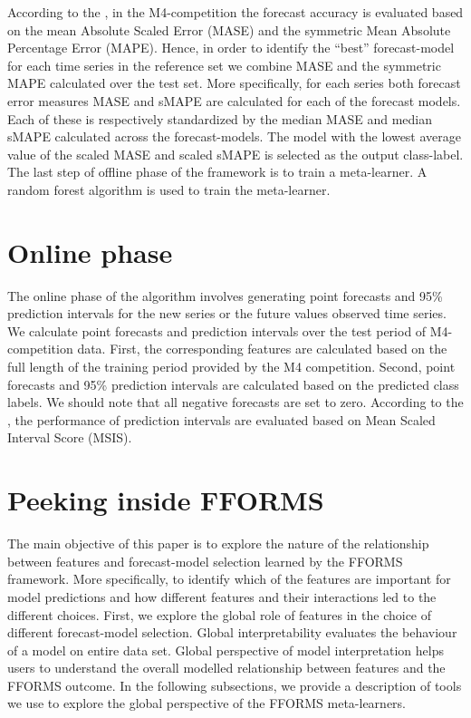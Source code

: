 \documentclass[11pt,a4paper,]{article}
\begin{document}
According to the \textcite{M4compguide}, in the M4-competition the forecast accuracy is evaluated based on the mean Absolute Scaled Error (MASE) and the symmetric Mean Absolute Percentage Error (MAPE). Hence, in order to identify the ``best'' forecast-model for each time series in the reference set we combine MASE and the symmetric MAPE calculated over the test set. More specifically, for each series both forecast error measures MASE and sMAPE are calculated for each of the forecast models. Each of these is respectively standardized by the median MASE and median sMAPE calculated across the forecast-models. The model with the lowest average value of the scaled MASE and scaled sMAPE is selected as the output class-label. The last step of offline phase of the framework is to train a meta-learner. A random forest algorithm is used to train the meta-learner.

\hypertarget{online}{%
\section{Online phase}\label{online}}

The online phase of the algorithm involves generating point forecasts and 95\% prediction intervals for the new series or the future values observed time series. We calculate point forecasts and prediction intervals over the test period of M4-competition data. First, the corresponding features are calculated based on the full length of the training period provided by the M4 competition. Second, point forecasts and 95\% prediction intervals are calculated based on the predicted class labels. We should note that all negative forecasts are set to zero. According to the \textcite{M4compguide}, the performance of prediction intervals are evaluated based on Mean Scaled Interval Score (MSIS).

\hypertarget{peeking}{%
\section{Peeking inside FFORMS}\label{peeking}}

The main objective of this paper is to explore the nature of the relationship between features and forecast-model selection learned by the FFORMS framework. More specifically, to identify which of the features are important for model predictions and how different features and their interactions led to the different choices. First, we explore the global role of features in the choice of different forecast-model selection. Global interpretability evaluates the behaviour of a model on entire data set. Global perspective of model interpretation helps users to understand the overall modelled relationship between features and the FFORMS outcome. In the following subsections, we provide a description of tools we use to explore the global perspective of the FFORMS meta-learners.
\end{document}
